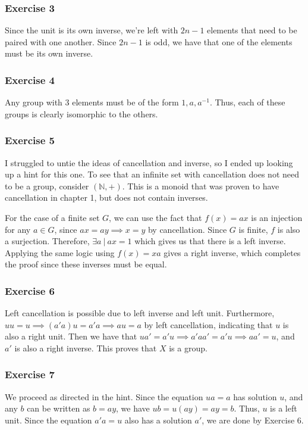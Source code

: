 \subsubsection{Exercise 3}
Since the unit is its own inverse, we're left with $2n - 1$ elements that need to be paired with one another.
Since $2n - 1$ is odd, we have that one of the elements must be its own inverse.

\subsubsection{Exercise 4}
Any group with 3 elements must be of the form $1, a, a^{-1}$. Thus, each of these groups is clearly
isomorphic to the others.

\subsubsection{Exercise 5}
I struggled to untie the ideas of cancellation and inverse, so I ended up looking up a hint for this one. To
see that an infinite set with cancellation does not need to be a group, consider $(\mathbb{N}, +)$.
This is a monoid that was proven to have cancellation in chapter 1, but does not contain inverses.

For the case of a finite set $G$, we can use the fact that $f(x) = ax$ is an injection for any $a \in G$, 
since $ax = ay \implies x = y$ by cancellation. Since $G$ is finite, $f$ is also a surjection. Therefore,
$\exists a \: | \: ax = 1$ which gives us that there is a left inverse. Applying the same logic using
$f(x) = xa$ gives a right inverse, which completes the proof since these inverses must be equal.

\subsubsection{Exercise 6}
Left cancellation is possible due to left inverse and left unit.
Furthermore, $uu = u \implies (a' a) u = a' a \implies a u = a$ by left cancellation, indicating that 
$u$ is also a right unit. Then we have that $u a' = a' u \implies a' a a' = a' u \implies a a' = u$, 
and $a'$ is also a right inverse. This proves that $X$ is a group.

\subsubsection{Exercise 7}
We proceed as directed in the hint. Since the equation $ua = a$ has solution $u$, and any $b$ 
can be written as $b = ay$, we have $u b = u (ay) = ay = b$. Thus, $u$ is a left unit. Since
the equation $a'a = u$ also has a solution $a'$, we are done by Exercise 6.

